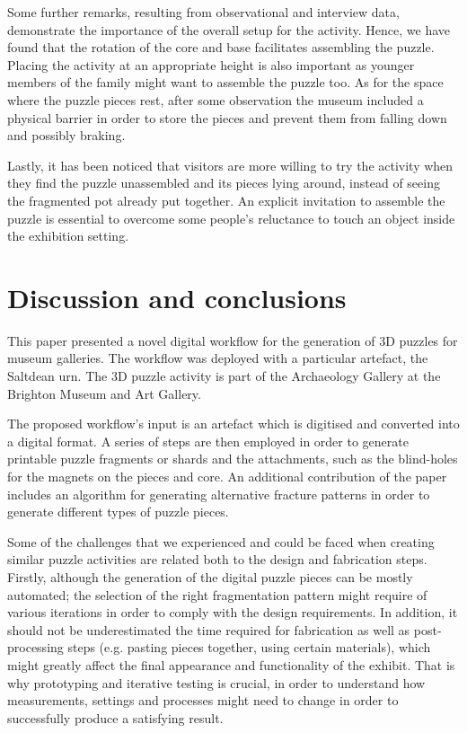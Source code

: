 \documentclass[acmlarge,screen,dvipsnames]{acmart}
\begin{document}
Some further remarks, resulting from observational and interview data,
demonstrate the importance of the overall setup for the activity. 
Hence, we have found that the rotation of the core and base
facilitates assembling the puzzle. Placing
the activity at an appropriate height is also important as younger
members of the family might want to assemble the puzzle too.  
As for the space where the puzzle pieces rest, after some observation
the museum included a physical barrier in order to store the
pieces and prevent them from falling down and possibly braking. 


Lastly, it has been noticed that
visitors are more willing to try the activity when they find the
puzzle unassembled and its pieces lying around, instead of seeing the
fragmented pot already put together. An explicit invitation to
assemble the puzzle is essential to overcome some people’s reluctance
to touch an object inside the exhibition setting. 

\greenEnd






\section{Discussion and conclusions}
\label{conclusions}

This paper presented a novel digital workflow for the generation of 3D
puzzles for museum galleries. The workflow was deployed with a
particular artefact, the Saltdean urn. The 3D puzzle activity is part
of the Archaeology Gallery at the Brighton Museum and Art Gallery.

The proposed workflow's input is an artefact which is digitised and
converted into a digital format. A series of steps are then employed
in order to generate printable puzzle fragments or shards and the
attachments, such as the blind-holes for the magnets on the pieces and
core. An additional contribution of the paper includes an algorithm
for generating alternative fracture patterns in order to generate
different types of puzzle pieces.

Some of the challenges that we experienced and could be faced when
creating similar puzzle activities are related both to the design and
fabrication steps. Firstly, although the generation of the digital
puzzle pieces can be mostly automated; the selection of the right
fragmentation pattern might require of various iterations in order to
comply with the design requirements. In addition, it should not be
underestimated the time required for fabrication as well as
post-processing steps (e.g. pasting pieces together, using certain
materials), which might greatly affect the final appearance and
functionality of the exhibit. That is why prototyping and iterative
testing is crucial, in order to understand how measurements, settings
and processes might need to change in order to successfully produce a
satisfying result.
\end{document}
